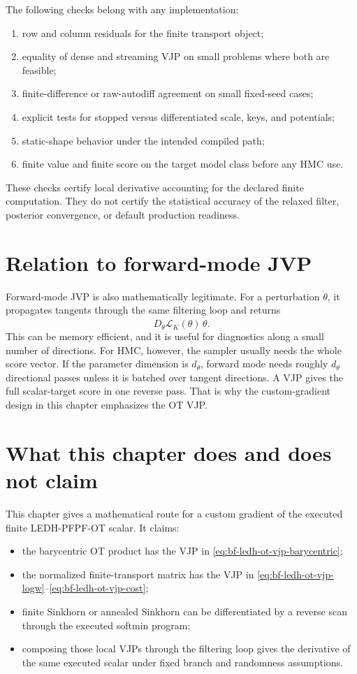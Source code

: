 The following checks belong with any implementation:
\begin{enumerate}[label=(\arabic*)]
  \item row and column residuals for the finite transport object;
  \item equality of dense and streaming VJP on small problems where both are
  feasible;
  \item finite-difference or raw-autodiff agreement on small fixed-seed cases;
  \item explicit tests for stopped versus differentiated scale, keys, and
  potentials;
  \item static-shape behavior under the intended compiled path;
  \item finite value and finite score on the target model class before any HMC
  use.
\end{enumerate}

These checks certify local derivative accounting for the declared finite
computation.  They do not certify the statistical accuracy of the relaxed
filter, posterior convergence, or default production readiness.

\section{Relation to forward-mode JVP}
\label{sec:bf-ledh-ot-jvp}

Forward-mode JVP is also mathematically legitimate.  For a perturbation
\(\dot\theta\), it propagates tangents through the same filtering loop and
returns
\[
  D_\theta\mathcal L_K(\theta)\,\dot\theta .
\]
This can be memory efficient, and it is useful for diagnostics along a small
number of directions.  For HMC, however, the sampler usually needs the whole
score vector.  If the parameter dimension is \(d_\theta\), forward mode needs
roughly \(d_\theta\) directional passes unless it is batched over tangent
directions.  A VJP gives the full scalar-target score in one reverse pass.  That
is why the custom-gradient design in this chapter emphasizes the OT VJP.

\section{What this chapter does and does not claim}
\label{sec:bf-ledh-ot-boundary}

This chapter gives a mathematical route for a custom gradient of the executed
finite LEDH-PFPF-OT scalar.  It claims:
\begin{itemize}
  \item the barycentric OT product has the VJP in
  \eqref{eq:bf-ledh-ot-vjp-barycentric};
  \item the normalized finite-transport matrix has the VJP in
  \eqref{eq:bf-ledh-ot-vjp-logw}--\eqref{eq:bf-ledh-ot-vjp-cost};
  \item finite Sinkhorn or annealed Sinkhorn can be differentiated by a reverse
  scan through the executed softmin program;
  \item composing those local VJPs through the filtering loop gives the
  derivative of the same executed scalar under fixed branch and randomness
  assumptions.
\end{itemize}

